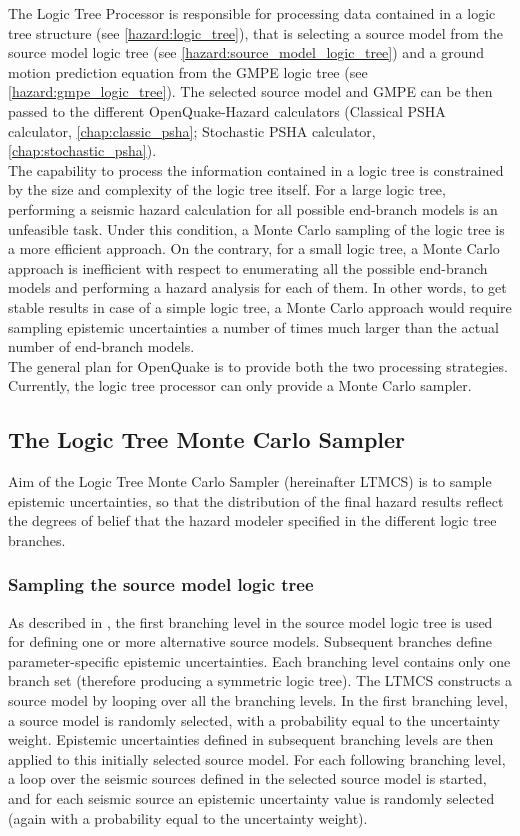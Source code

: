 The Logic Tree Processor is responsible for processing data contained in a logic tree structure (see \ref{hazard:logic_tree}), that is selecting a source model from the source model logic tree (see \ref{hazard:source_model_logic_tree}) and a ground motion prediction equation from the GMPE logic tree (see \ref{hazard:gmpe_logic_tree}). The selected source model and GMPE can be then passed to the different OpenQuake-Hazard calculators (Classical PSHA calculator, \ref{chap:classic_psha}; Stochastic PSHA calculator, \ref{chap:stochastic_psha}).\\
The capability to process the information contained in a logic tree is constrained by the size and complexity of the logic tree itself. For a large logic tree, performing a seismic hazard calculation for all possible end-branch models is an unfeasible task. Under this condition, a Monte Carlo sampling of the logic tree is a more efficient approach. On the contrary, for a small logic tree, a Monte Carlo approach is inefficient with respect to enumerating all the possible end-branch models and performing a hazard analysis for each of them. In other words, to get stable results in case of a simple logic tree,  a Monte Carlo approach would require sampling epistemic uncertainties a number of times much larger than the actual number of end-branch models.\\
The general plan for OpenQuake is to provide both the two processing strategies. Currently, the logic tree processor can only provide a Monte Carlo sampler.
\subsection{The Logic Tree Monte Carlo Sampler}
Aim of the Logic Tree Monte Carlo Sampler (hereinafter LTMCS) is to sample epistemic uncertainties, so that the distribution of the final hazard results reflect the degrees of belief that the hazard modeler specified in the different logic tree branches.\\
\subsubsection{Sampling the source model logic tree}
As described in \label{hazard:source_model_logic_tree}, the first branching level in the source model logic tree is used for defining one or more alternative source models. Subsequent branches define parameter-specific epistemic uncertainties. Each branching level contains only one branch set (therefore producing a symmetric logic tree). The LTMCS constructs a source model by looping over all the branching levels. In the first branching level, a source model is randomly selected, with a probability equal to the uncertainty weight. Epistemic uncertainties defined in subsequent branching levels are then applied to this initially selected source model. For each following branching level, a loop over the seismic sources defined in the selected source model is started, and for each seismic source an epistemic uncertainty value is randomly selected (again with a probability equal to the uncertainty weight).